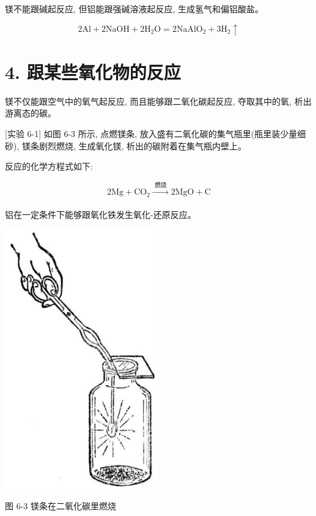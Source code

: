 \documentclass[10pt]{article}
\begin{document}
镁不能跟碱起反应, 但铝能跟强碱溶液起反应, 生成氢气和偏铝酸盐。

\[
2\mathrm{{Al}} + 2\mathrm{{NaOH}} + 2{\mathrm{H}}_{2}\mathrm{O} = 2{\mathrm{{NaAlO}}}_{2} + 3{\mathrm{H}}_{2} \uparrow
\]

\section*{4. 跟某些氧化物的反应}

镁不仅能跟空气中的氧气起反应, 而且能够跟二氧化碳起反应, 夺取其中的氧, 析出游离态的碳。

[实验 6-1] 如图 6-3 所示, 点燃镁条, 放入盛有二氧化碳的集气瓶里(瓶里装少量细砂), 镁条剧烈燃烧, 生成氧化镁, 析出的碳附着在集气瓶内壁上。

反应的化学方程式如下:

\[
2\mathrm{{Mg}} + {\mathrm{{CO}}}_{2}\xrightarrow[]{\text{ 燃烧 }}2\mathrm{{MgO}} + \mathrm{C}
\]

铝在一定条件下能够跟氧化铁发生氧化-还原反应。

\begin{center}
\includegraphics[max width=0.5\textwidth]{images/01912d13-9986-7822-a012-3f3f7be99dcb_188_923964.jpg}
\end{center}

图 6-3 镁条在二氧化碳里燃烧
\end{document}
